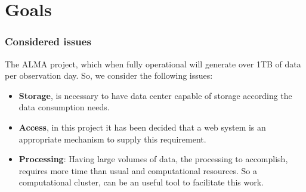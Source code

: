 \section{Goals}

\begin{frame}
\frametitle{Considered issues}

The ALMA project, which when fully operational will generate over 1TB of data per observation day. So, we consider the
following issues:

\begin{itemize}
	\item \textbf{Storage}, is necessary to have data center capable of storage according the data consumption needs.
	\item \textbf{Access}, in this project it has been decided that a web system is an appropriate mechanism to supply
		this requirement.
	\item \textbf{Processing}: Having large volumes of data, the processing to accomplish, requires more time than usual
		and computational resources. So a computational cluster, can be an useful tool to facilitate this work.
\end{itemize}

\end{frame}
